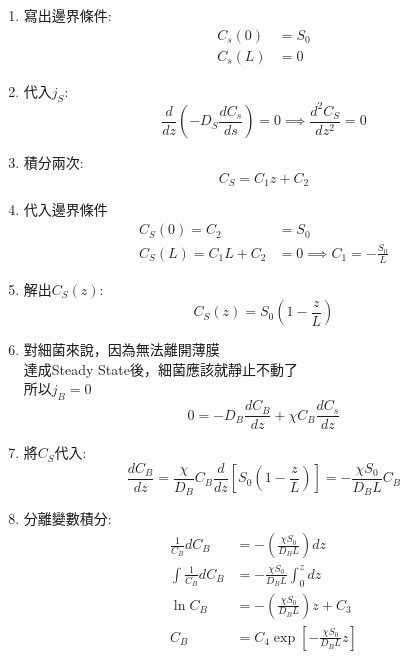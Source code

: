 \documentclass[../main.tex]{subfiles}
\begin{document}
\begin{itemize}
\begin{enumerate}
    \item 寫出邊界條件:
    \begin{align}
      C_s(0) &= S_0\\
      C_s(L) &= 0
    \end{align}
    \item 代入$j_S$:
    \begin{equation}
      \frac{d}{dz}\left(-D_S\frac{dC_s}{ds}\right) = 0 \implies \frac{d^2C_S}{dz^2} = 0
    \end{equation}
    \item 積分兩次:
    \begin{equation}
      C_S =C_1 z + C_2
    \end{equation}
    \item 代入邊界條件
    \begin{align}
      C_S(0) = C_2 &= S_0\\
      C_S(L) = C_1 L + C_2 &= 0 \implies C_1 = -\frac{S_0}{L}
    \end{align}
    \item 解出$C_S(z)$:
    \begin{equation}
      \boxed{C_S(z) = S_0\left(1-\frac{z}{L}\right)}
    \end{equation}
    \item 對細菌來說，因為無法離開薄膜\\
    達成Steady State後，細菌應該就靜止不動了\\
    所以$j_B=0$
    \begin{equation}
      0 = -D_B \frac{dC_B}{dz} + \chi C_B \frac{dC_s}{dz}
    \end{equation}
    \item 將$C_S$代入:
    \begin{equation}
      \frac{dC_B}{dz} = \frac{\chi}{D_B} C_B \frac{d}{dz}\left[S_0\left(1-\frac{z}{L}\right)\right] = -\frac{\chi S_0}{D_B L} C_B
    \end{equation}
    \item 分離變數積分:
    \begin{align}
      \frac{1}{C_B}dC_B &= -\left(
        \frac{\chi S_0}{D_B L}
      \right)dz\nonumber\\
      \int \frac{1}{C_B} dC_B &= -\frac{\chi S_0}{D_B L} \int_0^z dz\\
      \ln C_B &= -\left(
        \frac{\chi S_0}{D_B L}
      \right)z + C_3\nonumber\\
      C_B &=C_4 \exp\left[-
        \frac{\chi S_0}{D_B L}z\right]
    \end{align}

\end{enumerate}
\end{itemize}
\end{document}
